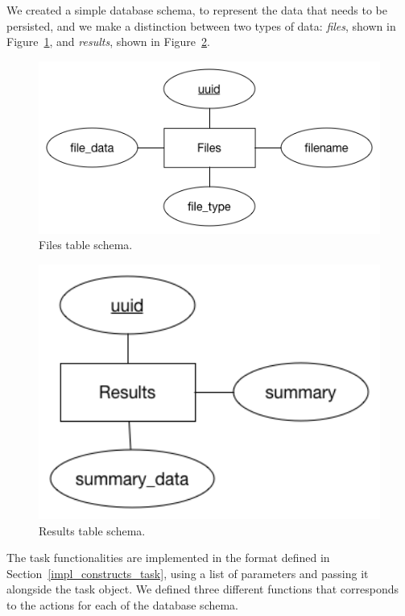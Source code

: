 \documentclass[12pt, titlepage]{uo_temp}
\begin{document}
     We created a simple database schema, to represent the data that needs to be
     persisted, and we make a distinction between two types of data: \emph{files}, shown
     in Figure~\ref{files_scm}, and \emph{results}, shown in Figure~\ref{results_scm}.
     
     \begin{figure}[h!]
       \centering
       \includegraphics[width=125mm]{images/mdts_files_db_schema.png}
       \caption{Files table schema.}\label{files_scm}
     \end{figure}

     \begin{figure}[h!]
       \centering
       \includegraphics[width=125mm]{images/mdts_results_db_schema.png}
       \caption{Results table schema.}\label{results_scm}
     \end{figure}

     The task functionalities are implemented in the format defined in
     Section~\ref{impl_constructs_task}, using a list of parameters and passing it
     alongside the task object. We defined three different functions that corresponds to the
     actions for each of the database schema.
     
\end{document}
